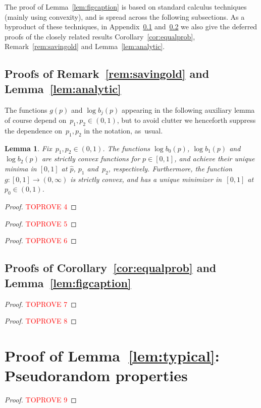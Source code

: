 \documentclass{article}
\newcommand{\ps}{\hat{p}}
\newtheorem{lemma}[thm]{Lemma}
\newcommand{\refL}[1]{Lemma~\ref{#1}}
\begin{document}
The proof of Lemma~\ref{lem:figcaption} is based on standard calculus techniques (mainly using convexity), and is spread across the following subsections.
As a byproduct of these techniques, in Appendix~\ref{sec:deferred1} and~\ref{sec:keylemma:apx}
we also give the deferred proofs of the closely related results Corollary~\ref{cor:equalprob}, Remark~\ref{rem:savingold} and Lemma~\ref{lem:analytic}. 




\subsection{Proofs of Remark~\ref{rem:savingold} and  Lemma~\ref{lem:analytic}} \label{sec:deferred1}
The functions $g(p)$ and ${\log b_j(p)}$ appearing in the following auxiliary lemma of course depend on~$p_1,p_2 \in (0,1)$, but to avoid clutter we henceforth suppress the dependence on~$p_1,p_2$ in the notation, as~usual.
\begin{lemma}\label{lem:strictlyconvex}
Fix~$p_1,p_2 \in (0,1)$. 
The functions $\log b_0(p)$, $\log b_1(p)$ and~$\log b_2(p)$ are strictly convex functions for $p\in [0,1]$, and achieve their unique minima in $[0,1]$ at $\ps$, $p_1$ and~$p_2$, respectively.
Furthermore, 
the function~$g:[0,1] \to (0,\infty)$ is strictly convex, and has a unique minimizer in~$[0,1]$ at~$p_0 \in (0,1)$.
\end{lemma}
\begin{proof}\textcolor{red}{TOPROVE 4}\end{proof}


\begin{proof}\textcolor{red}{TOPROVE 5}\end{proof}



\begin{proof}\textcolor{red}{TOPROVE 6}\end{proof}






\subsection{Proofs of Corollary~\ref{cor:equalprob} and Lemma~\ref{lem:figcaption}}\label{sec:keylemma:apx}\begin{proof}\textcolor{red}{TOPROVE 7}\end{proof}




\begin{proof}\textcolor{red}{TOPROVE 8}\end{proof}




\section{Proof of \refL{lem:typical}: Pseudorandom properties}\label{apx:pseudorandom}
\begin{proof}\textcolor{red}{TOPROVE 9}\end{proof}
\end{document}
